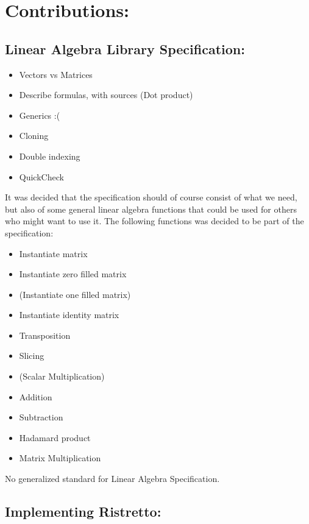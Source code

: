 \documentclass{article}
\begin{document}
\section{Contributions:}

\subsection{Linear Algebra Library Specification:}
\begin{itemize}
    \item Vectors vs Matrices 
    \item Describe formulas, with sources (Dot product) 
    \item Generics :(
    \item Cloning
    \item Double indexing
    \item QuickCheck
\end{itemize} 
It was decided that the specification should of course consist of what we need, but also of some general linear algebra functions that could be used for others who might want to use it. The following functions was decided to be part of the specification:
\begin{itemize}
    \item Instantiate matrix
    \item Instantiate zero filled matrix
    \item (Instantiate one filled matrix)
    \item Instantiate identity matrix
    \item Transposition
    \item Slicing
    \item (Scalar Multiplication)
    \item Addition
    \item Subtraction
    \item Hadamard product
    \item Matrix Multiplication
\end{itemize}

No generalized standard for Linear Algebra Specification.



\subsection{Implementing Ristretto:} \label{implementing-ristretto}
\end{document}
